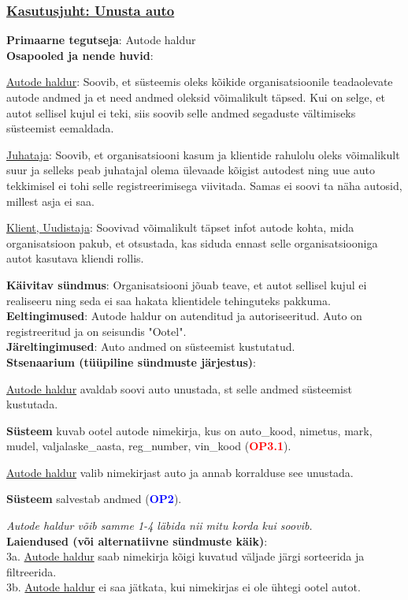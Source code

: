 \begin{shaded}
	\subsubsection{\underline{Kasutusjuht: Unusta auto}}
	\textbf{Primaarne tegutseja}: Autode haldur \\
	\textbf{Osapooled ja nende huvid}: 
	\useDash
	\begin{myitemize}
		\item \underline{Autode haldur}: Soovib, et süsteemis oleks kõikide organisatsioonile teadaolevate autode andmed ja et need andmed oleksid võimalikult täpsed. Kui on selge, et autot sellisel kujul ei teki, siis soovib selle andmed segaduste vältimiseks süsteemist eemaldada.
		\item \underline{Juhataja}: Soovib, et organisatsiooni kasum ja klientide rahulolu oleks võimalikult suur ja selleks peab juhatajal olema ülevaade kõigist autodest ning uue auto tekkimisel ei tohi selle registreerimisega viivitada. Samas ei soovi ta näha autosid, millest asja ei saa.
		\item \underline{Klient, Uudistaja}: Soovivad võimalikult täpset infot autode kohta, mida organisatsioon pakub, et otsustada, kas siduda ennast selle organisatsiooniga autot kasutava kliendi rollis.
	\end{myitemize}
	\textbf{Käivitav sündmus}: Organisatsiooni jõuab teave, et autot sellisel kujul ei realiseeru ning seda ei saa hakata klientidele tehinguteks pakkuma. \\
	\textbf{Eeltingimused}: Autode haldur on autenditud ja autoriseeritud. Auto on registreeritud ja on seisundis "Ootel". \\
	\textbf{Järeltingimused}: Auto andmed on süsteemist kustutatud. \\
	\textbf{Stsenaarium (tüüpiline sündmuste järjestus)}:
	\begin{myenumerate}
		\item \underline{Autode haldur} avaldab soovi auto unustada, st selle andmed süsteemist kustutada.
		\item \textbf{Süsteem} kuvab ootel autode nimekirja, kus on auto\_kood, nimetus,  mark, mudel, valjalaske\_aasta, reg\_number, vin\_kood (\textbf{\textcolor{red}{OP3.1}}).
		\item \underline{Autode haldur} valib nimekirjast auto ja annab korralduse see unustada.
		\item \textbf{Süsteem} salvestab andmed (\textbf{\textcolor{blue}{OP2}}).
	\end{myenumerate}
	\textit{Autode haldur võib samme 1-4 läbida nii mitu korda kui soovib.} \\
	\textbf{Laiendused  (või alternatiivne sündmuste käik)}: \\
	\indent 3a. \underline{Autode haldur} saab nimekirja kõigi kuvatud väljade järgi sorteerida ja filtreerida. \\
	\indent 3b. \underline{Autode haldur} ei saa jätkata, kui nimekirjas ei ole ühtegi ootel autot.
\end{shaded}

